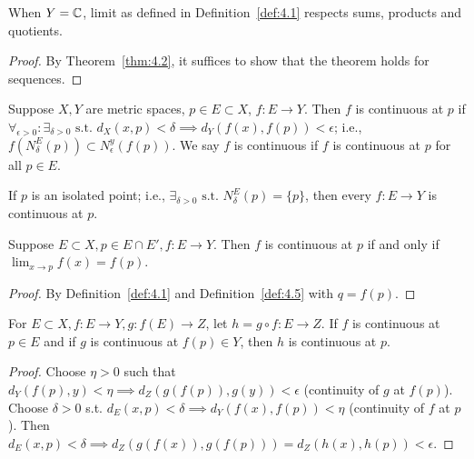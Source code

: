 \begin{theorem}[4]
	When $Y=\mathbb{C}$, limit as defined in Definition~\ref{def:4.1} respects sums, products and quotients.
	\begin{proof}
		By Theorem~\ref{thm:4.2}, it suffices to show that the theorem holds for sequences.
	\end{proof}
\end{theorem}

\begin{definition}
	\label{def:4.5}
	Suppose $X,Y$ are metric spaces, $p \in E \subset X$, $f: E\to Y$. Then $f$ is continuous at $p$ if $\forall_{\epsilon > 0}: \exists_{\delta > 0} \text{ s.t. } d_X(x,p)<\delta \implies d_Y(f(x),f(p))<\epsilon$; i.e., $f(N_{\delta}^{E}(p)) \subset N_{\epsilon}^{y}(f(p))$. We say $f$ is continuous if $f$ is continuous at $p$ for all $p \in E$.
	\begin{note}
		If $p$ is an isolated point; i.e., $\exists_{\delta >0} \text{ s.t. } N_{\delta}^{E}(p)=\{p\}$, then every $f: E\to Y$ is continuous at $p$.
	\end{note}
\end{definition}

\begin{theorem}[6]
	Suppose $E \subset X, p \in E \cap E', f: E\to Y$. Then $f$ is continuous at $p$ if and only if $\lim_{x\to p}{f(x)}=f(p)$.
	\begin{proof}
		By Definition~\ref{def:4.1} and Definition~\ref{def:4.5} with $q=f(p)$.
	\end{proof}
\end{theorem}

\begin{theorem}[7]
	For $E \subset  X, f: E\to Y, g: f(E)\to Z$, let $h=g \circ f: E\to Z$. If $f$ is continuous at $p \in E$ and if $g$ is continuous at $f(p) \in Y$, then $h$ is continuous at $p$.
	\begin{proof}
		Choose $\eta>0$ such that $d_{Y}(f(p),y)<\eta \implies d_{Z}(g(f(p)),g(y))<\epsilon$ (continuity of $g$ at $f(p)$).
		Choose $\delta>0$ s.t. $d_E(x,p)<\delta \implies d_Y(f(x),f(p))<\eta$ (continuity of $f$ at $p$).
		Then $d_E(x,p)<\delta \implies d_Z(g(f(x)),g(f(p)))=d_Z(h(x),h(p))<\epsilon$.
	\end{proof}
\end{theorem}

